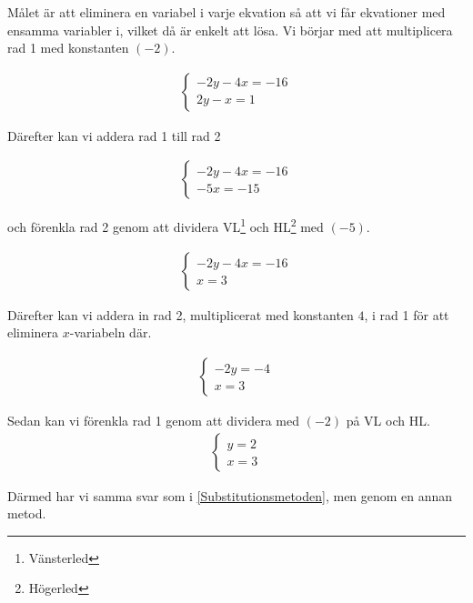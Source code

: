 Målet är att eliminera en variabel i varje ekvation så att vi får ekvationer med ensamma variabler i, vilket då är enkelt att lösa. Vi börjar med att multiplicera rad 1 med konstanten $(-2)$.

\begin{align}
	\begin{cases}
		-2y-4x=-16 \\
		2y-x = 1
	\end{cases}
\end{align}

Därefter kan vi addera rad 1 till rad 2

\begin{align}
	\begin{cases}
		-2y-4x=-16 \\
		-5x = -15
	\end{cases}
\end{align}

och förenkla rad 2 genom att dividera VL\footnote{Vänsterled} och HL\footnote{Högerled} med $(-5)$.

\begin{align}
	\begin{cases}
		-2y-4x=-16 \\
		x = 3
	\end{cases}
\end{align}

Därefter kan vi addera in rad 2, multiplicerat med konstanten $4$, i rad 1 för att eliminera $x$-variabeln där.

\begin{align}
	\begin{cases}
		-2y=-4 \\
		x = 3
	\end{cases}
\end{align}

Sedan kan vi förenkla rad 1 genom att dividera med $(-2)$ på VL och HL.
\begin{align}
	\begin{cases}
		y=2 \\
		x = 3
	\end{cases}
\end{align}

Därmed har vi samma svar som i \ref{Substitutionsmetoden}, men genom en annan metod.


























